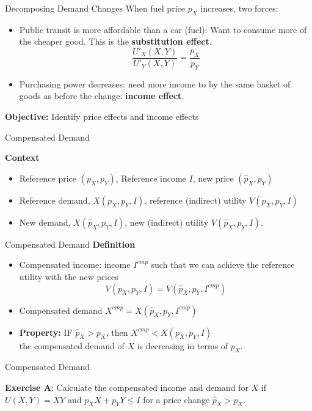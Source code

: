 \documentclass[handout]{beamer}
\newenvironment{iPar}[1]{\textbf{#1} \begin{itemize}}{\end{itemize}}
\newcommand{\cp}{{cmp}}
\begin{document}
\begin{frame}{Decomposing Demand Changes}
When fuel price $p_X$ increases, two forces: \begin{itemize}
\item Public transit is more affordable than a car (fuel): Want to consume more of the cheaper good. This is the \textbf{substitution effect}. $$ \frac{U'_X(X,Y)}{U'_Y(X,Y)} = \frac{p_X}{p_Y}$$

\item Purchasing power decreases: need more income to by the same basket of goods as before the change: \textbf{income effect}.
\end{itemize}

\textbf{Objective:} Identify price effects and income effects

\end{frame}

\begin{frame}{Compensated Demand}

\begin{iPar}{Context}
\item Reference price $(p_X,p_Y)$, Reference income $I$, new price $(\hat p_X,p_Y)$
\item Reference demand, $X(p_X,p_Y,I)$, reference (indirect) utility $V(p_X,p_Y,I)$
\item New demand, $X(\hat p_X, p_Y, I)$, new (indirect) utility $V(\hat p_X,p_Y,I)$.
\end{iPar}
\end{frame}

\begin{frame}{Compensated Demand}
\begin{iPar}{Definition}
\item Compensated income: income $I^\cp$ such that we can achieve the reference utility with the new prices $$V(p_X,p_Y, I) = V(\hat p_X, p_Y,  I^\cp)$$
\item Compensated demand $X^\cp = X(\hat p_X, p_Y,  I^\cp)$
\item \textbf{Property:}  IF $\hat p_X > p_X$, then $X^\cp <X(p_X,p_Y,I)$\\ the compensated demand of $X$ is decreasing in terms of $p_X$.
\end{iPar}
\end{frame}

\begin{frame}{Compensated Demand}

\textbf{Exercise A}: Calculate the compensated income and demand for $X$ if $U(X,Y) = XY$ and $p_XX+p_YY \le I$ for a price change $\hat p_X > p_X$. 

\end{frame}
\end{document}
